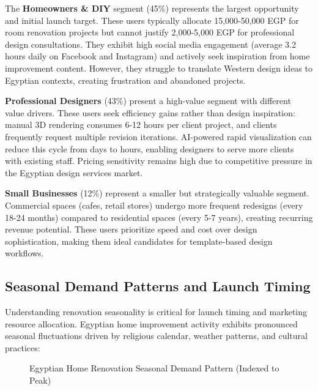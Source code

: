 The \textbf{Homeowners \& DIY} segment (45\%) represents the largest opportunity and initial launch target. These users typically allocate 15,000-50,000 EGP for room renovation projects but cannot justify 2,000-5,000 EGP for professional design consultations. They exhibit high social media engagement (average 3.2 hours daily on Facebook and Instagram) and actively seek inspiration from home improvement content. However, they struggle to translate Western design ideas to Egyptian contexts, creating frustration and abandoned projects.

\textbf{Professional Designers} (43\%) present a high-value segment with different value drivers. These users seek efficiency gains rather than design inspiration: manual 3D rendering consumes 6-12 hours per client project, and clients frequently request multiple revision iterations. AI-powered rapid visualization can reduce this cycle from days to hours, enabling designers to serve more clients with existing staff. Pricing sensitivity remains high due to competitive pressure in the Egyptian design services market.

\textbf{Small Businesses} (12\%) represent a smaller but strategically valuable segment. Commercial spaces (cafes, retail stores) undergo more frequent redesigns (every 18-24 months) compared to residential spaces (every 5-7 years), creating recurring revenue potential. These users prioritize speed and cost over design sophistication, making them ideal candidates for template-based design workflows.

\subsection{Seasonal Demand Patterns and Launch Timing}

Understanding renovation seasonality is critical for launch timing and marketing resource allocation. Egyptian home improvement activity exhibits pronounced seasonal fluctuations driven by religious calendar, weather patterns, and cultural practices:

\begin{figure}[htbp]
\centering
{}
\caption{Egyptian Home Renovation Seasonal Demand Pattern (Indexed to Peak)}
\label{fig:seasonal_demand}
\end{figure}

